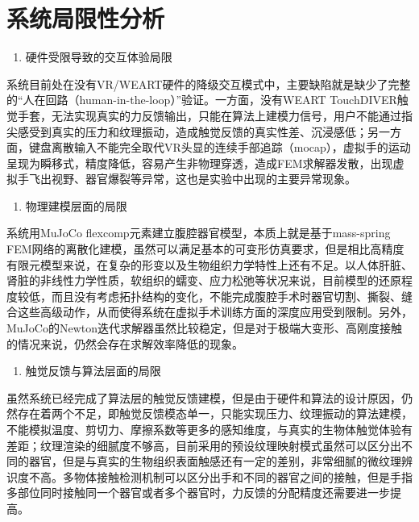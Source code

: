 \section{系统局限性分析}

\begin{enumerate}
\def\labelenumi{\arabic{enumi}.}
\item
  硬件受限导致的交互体验局限
\end{enumerate}

系统目前处在没有VR/WEART硬件的降级交互模式中，主要缺陷就是缺少了完整的``人在回路（human-in-the-loop）''验证。一方面，没有WEART
TouchDIVER触觉手套，无法实现真实的力反馈输出，只能在算法上建模力信号，用户不能通过指尖感受到真实的压力和纹理振动，造成触觉反馈的真实性差、沉浸感低；另一方面，键盘离散输入不能完全取代VR头显的连续手部追踪（mocap），虚拟手的运动呈现为瞬移式，精度降低，容易产生非物理穿透，造成FEM求解器发散，出现虚拟手飞出视野、器官爆裂等异常，这也是实验中出现的主要异常现象。

\begin{enumerate}
\def\labelenumi{\arabic{enumi}.}
\setcounter{enumi}{1}
\item
  物理建模层面的局限
\end{enumerate}

系统用MuJoCo flexcomp元素建立腹腔器官模型，本质上就是基于mass-spring
FEM网络的离散化建模，虽然可以满足基本的可变形仿真要求，但是相比高精度有限元模型来说，在复杂的形变以及生物组织力学特性上还有不足。以人体肝脏、肾脏的非线性力学性质，软组织的蠕变、应力松弛等状况来说，目前模型的还原程度较低，而且没有考虑拓扑结构的变化，不能完成腹腔手术时器官切割、撕裂、缝合这些高级动作，从而使得系统在虚拟手术训练方面的深度应用受到限制。另外，MuJoCo的Newton迭代求解器虽然比较稳定，但是对于极端大变形、高刚度接触的情况来说，仍然会存在求解效率降低的现象。

\begin{enumerate}
\def\labelenumi{\arabic{enumi}.}
\setcounter{enumi}{2}
\item
  触觉反馈与算法层面的局限
\end{enumerate}

虽然系统已经完成了算法层的触觉反馈建模，但是由于硬件和算法的设计原因，仍然存在着两个不足，即触觉反馈模态单一，只能实现压力、纹理振动的算法建模，不能模拟温度、剪切力、摩擦系数等更多的感知维度，与真实的生物体触觉体验有差距；纹理渲染的细腻度不够高，目前采用的预设纹理映射模式虽然可以区分出不同的器官，但是与真实的生物组织表面触感还有一定的差别，非常细腻的微纹理辨识度不高。多物体接触检测机制可以区分出手和不同的器官之间的接触，但是手指多部位同时接触同一个器官或者多个器官时，力反馈的分配精度还需要进一步提高。

